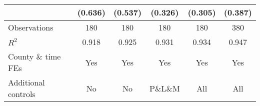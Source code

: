 {\begin{tabular}{l*{5}{c}}
                    &     (0.636)         &     (0.537)         &     (0.326)         &     (0.305)         &     (0.387)         \\
\hline
Observations        &         180         &         180         &         180         &         180         &         380         \\
\(R^{2}\)           &       0.918         &       0.925         &       0.931         &       0.934         &       0.947         \\
County \& time FEs  &         Yes         &         Yes         &         Yes         &         Yes         &         Yes         \\
Additional controls &          No         &          No         &     P\&L\&M         &         All         &         All         \\
\hline\hline
\end{tabular}
}

